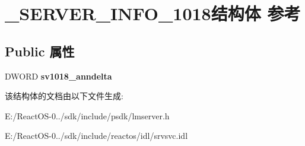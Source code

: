 \hypertarget{struct___s_e_r_v_e_r___i_n_f_o__1018}{}\section{\+\_\+\+S\+E\+R\+V\+E\+R\+\_\+\+I\+N\+F\+O\+\_\+1018结构体 参考}
\label{struct___s_e_r_v_e_r___i_n_f_o__1018}
\subsection*{Public 属性}
\begin{DoxyCompactItemize}
\item 
\mbox{\label{struct___s_e_r_v_e_r___i_n_f_o__1018_ac6b738e70fd55d9caff4c9d9296332e7}} 
D\+W\+O\+RD {\bfseries sv1018\+\_\+anndelta}
\end{DoxyCompactItemize}


该结构体的文档由以下文件生成\+:\begin{DoxyCompactItemize}
\item 
E\+:/\+React\+O\+S-\/0../sdk/include/psdk/lmserver.\+h\item 
E\+:/\+React\+O\+S-\/0../sdk/include/reactos/idl/srvsvc.\+idl\end{DoxyCompactItemize}
